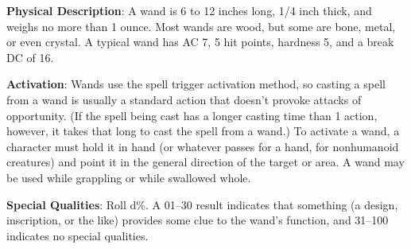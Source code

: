 
				
\textbf{Physical Description}: A wand is 6 to 12 inches long, 1/4 inch thick, and weighs no more than 1 ounce. Most wands are wood, but some are bone, metal, or even crystal. A typical wand has AC 7, 5 hit points, hardness 5, and a break DC of 16.
				
\textbf{Activation}: Wands use the spell trigger activation method, so casting a spell from a wand is usually a standard action that doesn't provoke attacks of opportunity. (If the spell being cast has a longer casting time than 1 action, however, it takes that long to cast the spell from a wand.) To activate a wand, a character must hold it in hand (or whatever passes for a hand, for nonhumanoid creatures) and point it in the general direction of the target or area. A wand may be used while grappling or while swallowed whole.
				
\textbf{Special Qualities}: Roll d\%. A 01--30 result indicates that something (a design, inscription, or the like) provides some clue to the wand's function, and 31--100 indicates no special qualities.        	
